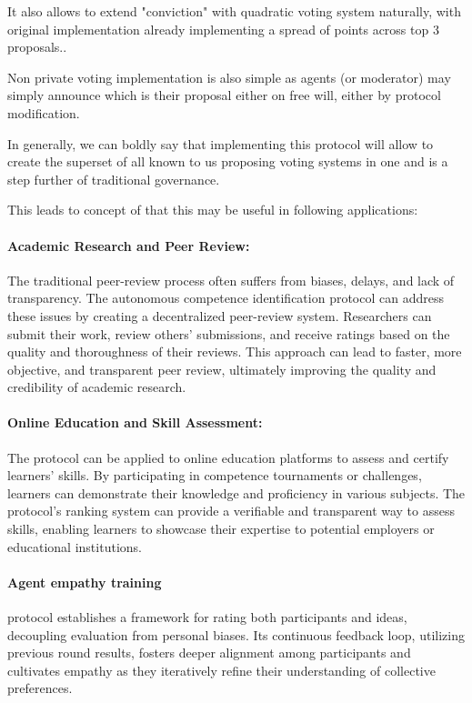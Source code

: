 \documentclass{article}
\begin{document}
\begin{CJK}{UTF8}{gbsn}
\begin{multicols}{2}
        It also allows to extend "conviction" with quadratic voting system naturally, with original implementation already implementing a spread of points across top 3 proposals.\cite{Buterin20}\cite{Benhaim2024}.

        Non private voting implementation is also simple as agents (or moderator) may simply announce which is their proposal either on free will, either by protocol modification.

        In generally, we can boldly say that implementing this protocol will allow to create the superset of all known to us proposing voting systems in one and is a step further of traditional governance.

        This leads to concept of that this may be useful in following applications:

        \paragraph*{Academic Research and Peer Review:} The traditional peer-review process often suffers from biases, delays, and lack of transparency. The autonomous competence identification protocol can address these issues by creating a decentralized peer-review system. Researchers can submit their work, review others' submissions, and receive ratings based on the quality and thoroughness of their reviews. This approach can lead to faster, more objective, and transparent peer review, ultimately improving the quality and credibility of academic research.

        \paragraph*{Online Education and Skill Assessment:} The protocol can be applied to online education platforms to assess and certify learners' skills. By participating in competence tournaments or challenges, learners can demonstrate their knowledge and proficiency in various subjects. The protocol's ranking system can provide a verifiable and transparent way to assess skills, enabling learners to showcase their expertise to potential employers or educational institutions.

        \paragraph{Agent empathy training} protocol establishes a framework for rating both participants and ideas, decoupling evaluation from personal biases. Its continuous feedback loop, utilizing previous round results, fosters deeper alignment among participants and cultivates empathy as they iteratively refine their understanding of collective preferences.


\end{multicols}
\end{CJK}
\end{document}
